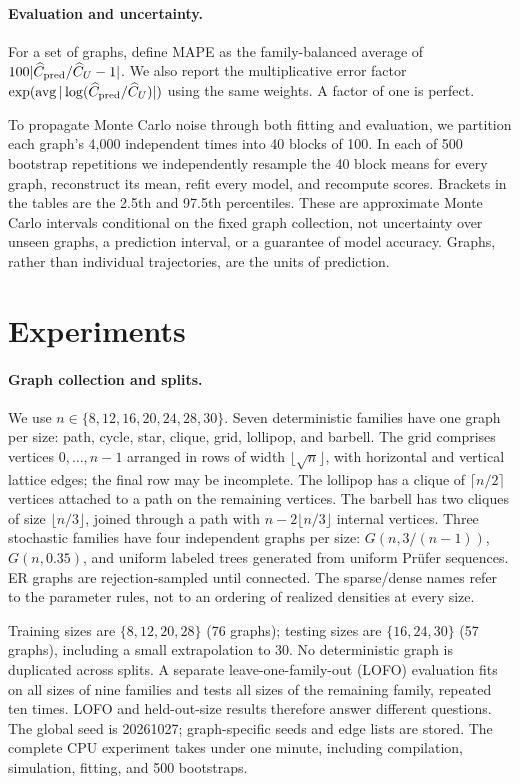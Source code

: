 \documentclass{article}
\begin{document}
\paragraph{Evaluation and uncertainty.}
For a set of graphs, define MAPE as the family-balanced average of
$100|\widehat C_{\rm pred}/\widehat C_U-1|$. We also report the multiplicative
error factor $\exp(\operatorname{avg}|\log(\widehat C_{\rm pred}/\widehat C_U)|)$
using the same weights. A factor of one is perfect.

To propagate Monte Carlo noise through both fitting and evaluation, we
partition each graph's 4,000 independent times into 40 blocks of 100.
In each of 500 bootstrap repetitions we independently resample the 40
block means for every graph, reconstruct its mean, refit every model,
and recompute scores. Brackets in the tables are the 2.5th and 97.5th
percentiles. These are approximate Monte Carlo intervals conditional on
the fixed graph collection, not uncertainty over unseen graphs, a
prediction interval, or a guarantee of model accuracy. Graphs, rather
than individual trajectories, are the units of prediction.

\section{Experiments}
\paragraph{Graph collection and splits.}
We use $n\in\{8,12,16,20,24,28,30\}$. Seven deterministic families have one
graph per size: path, cycle, star, clique, grid, lollipop, and barbell.
The grid comprises vertices $0,\ldots,n-1$ arranged in rows of width
$\lfloor\sqrt n\rfloor$, with horizontal and vertical lattice edges;
the final row may be incomplete. The lollipop has a clique of
$\lceil n/2\rceil$ vertices attached to a path on the remaining vertices.
The barbell has two cliques of size $\lfloor n/3\rfloor$, joined through
a path with $n-2\lfloor n/3\rfloor$ internal vertices.
Three stochastic families have four independent graphs per size:
$G(n,3/(n-1))$, $G(n,0.35)$, and uniform labeled trees generated from
uniform Pr\"ufer sequences. ER graphs are rejection-sampled until connected.
The sparse/dense names refer to the parameter rules, not to an ordering
of realized densities at every size.

Training sizes are $\{8,12,20,28\}$ (76 graphs); testing sizes are
$\{16,24,30\}$ (57 graphs), including a small extrapolation to 30.
No deterministic graph is duplicated across splits. A separate
leave-one-family-out (LOFO) evaluation fits on all sizes of nine families
and tests all sizes of the remaining family, repeated ten times.
LOFO and held-out-size results therefore answer different questions.
The global seed is 20261027; graph-specific seeds and edge lists are stored.
The complete CPU experiment takes under one minute, including compilation,
simulation, fitting, and 500 bootstraps.
\end{document}
